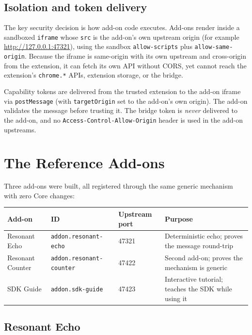 \documentclass[11pt]{article}
\begin{document}
\subsection{Isolation and token delivery}

The key security decision is how add-on code executes. Add-ons render inside a
sandboxed \texttt{iframe} whose \texttt{src} is the add-on's own upstream
origin (for example \url{http://127.0.0.1:47321}), using the sandbox
\texttt{allow-scripts} plus \texttt{allow-same-origin}. Because the iframe is
same-origin with its own upstream and cross-origin from the extension, it can
fetch its own API without CORS, yet cannot reach the extension's
\texttt{chrome.*} APIs, extension storage, or the bridge.

Capability tokens are delivered from the trusted extension to the add-on iframe
via \texttt{postMessage} (with \texttt{targetOrigin} set to the add-on's own
origin). The add-on validates the message before trusting it. The bridge token
is \emph{never} delivered to the add-on, and no \texttt{Access-Control-Allow-Origin}
header is used in the add-on upstreams.

\section{The Reference Add-ons}

Three add-ons were built, all registered through the same generic mechanism
with zero Core changes:

\begin{center}
\begin{tabular}{@{}p{3.1cm}p{3.0cm}p{3.2cm}p{3.6cm}@{}}
\toprule
\textbf{Add-on} & \textbf{ID} & \textbf{Upstream port} & \textbf{Purpose} \\
\midrule
Resonant Echo & \texttt{addon.resonant-echo} & 47321 & Deterministic echo; proves the message round-trip \\
Resonant Counter & \texttt{addon.resonant-counter} & 47422 & Second add-on; proves the mechanism is generic \\
SDK Guide & \texttt{addon.sdk-guide} & 47423 & Interactive tutorial; teaches the SDK while using it \\
\bottomrule
\end{tabular}
\end{center}

\subsection{Resonant Echo}
\end{document}
